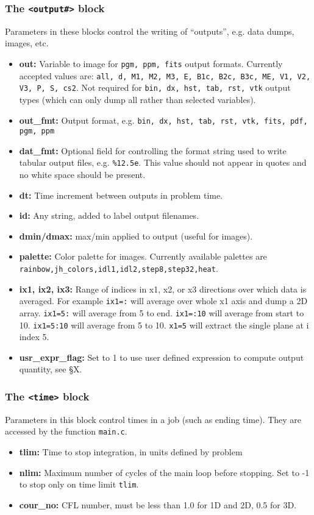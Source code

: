 \subsubsection{The {\tt <output\#>} block}

Parameters in these blocks control the writing of ``outputs'',
e.g. data dumps, images, etc.
\begin{itemize}
\item {\bf out:} Variable to image for {\tt pgm, ppm, fits} output formats.
Currently accepted values are:
{\tt all, d, M1, M2, M3, E, B1c, B2c, B3c, ME, V1, V2, V3, P, S, cs2}.
Not required for {\tt bin, dx, hst, tab, rst, vtk} output types 
(which can only dump all rather than selected variables).
\item {\bf out\_fmt:} Output format, e.g.  
{\tt bin, dx, hst, tab, rst, vtk, fits, pdf, pgm, ppm}
\item {\bf dat\_fmt:} Optional field for controlling the format string used 
to write tabular output files, e.g. {\tt \%12.5e}.  This value should
not appear in quotes and no white space should be present.
\item {\bf dt:} Time increment between outputs in problem time.
\item {\bf id:} Any string, added to label output filenames.
\item {\bf dmin/dmax:} max/min applied to output (useful for images).
\item {\bf palette:} Color palette for images.  Currently available palettes
are {\tt rainbow,jh\_colors,idl1,idl2,step8,step32,heat}.
\item {\bf ix1, ix2, ix3:} Range of indices in x1, x2, or x3 directions over
which data is averaged.  For example {\tt ix1=:} will average over whole x1 axis
and dump a 2D array.  {\tt ix1=5:} will average from 5 to end. {\tt ix1=:10}
will average from start to 10. {\tt ix1=5:10} will average from 5 to 10.
{\tt x1=5} will extract the single plane at i index 5.
\item {\bf usr\_expr\_flag:} Set to 1 to use user defined expression to compute
output quantity, see \S X.
\end{itemize}

\subsubsection{The {\tt <time>} block}

Parameters in this block control times in a job (such as ending time).
They are accessed by the function {\tt main.c}.
\begin{itemize}
\item {\bf tlim:} Time to stop integration, in units defined by problem
\item {\bf nlim:} Maximum number of cycles of the main loop before stopping.
Set to -1 to stop only on time limit {\tt tlim}.
\item {\bf cour\_no:}  CFL number, must be less than 1.0 for 1D and 2D, 0.5
for 3D.
\end{itemize}

